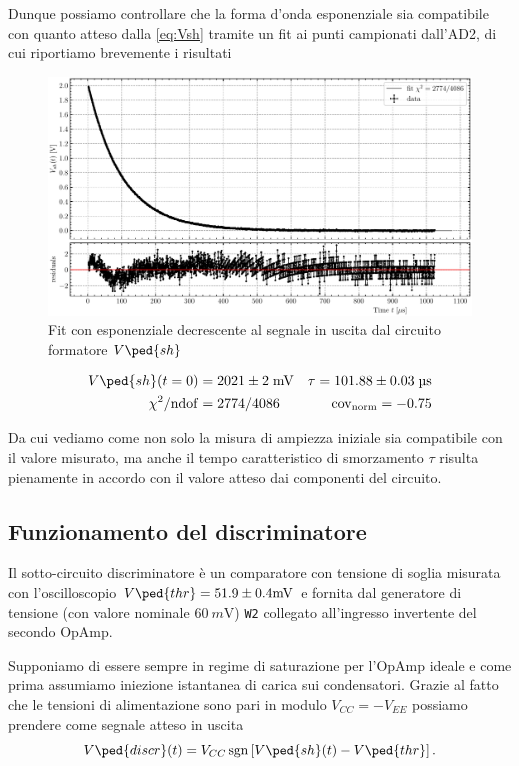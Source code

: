 \documentclass[10pt,a4paper]{article}
\begin{document}
Dunque possiamo controllare che la forma d'onda esponenziale sia compatibile
con quanto atteso dalla \eqref{eq:Vsh} tramite un fit ai punti campionati
dall'AD2, di cui riportiamo brevemente i risultati
\begin{figure}[htbp]
    \centering
	\includegraphics[scale=0.6]{tau}
    \caption{Fit con esponenziale decrescente al segnale in uscita dal
    circuito formatore $V\ped{sh}$ \label{fig: tau}}
\end{figure}
\begin{align*}
V\ped{sh} (t=0) &= 2021 \pm 2 \; \si{m\V}
&\tau = 101.88 \pm 0.03 \; \si{\micro\s} \\
\chi^2/\mathrm{ndof} &= 2774/4086 &\mathrm{cov_{norm}} = -0.75
\end{align*}

Da cui vediamo come non solo la misura di ampiezza iniziale sia compatibile
con il valore misurato, ma anche il tempo caratteristico di smorzamento $\tau$
risulta pienamente in accordo con il valore atteso dai componenti del
circuito.

\setcounter{subsection}{3}
\subsection{Funzionamento del discriminatore}
Il sotto-circuito discriminatore è un comparatore con tensione di soglia
misurata con l'oscilloscopio $V\ped{thr} = 51.9 \pm 0.4 \si{m\V}$ e fornita
dal generatore di tensione (con valore nominale $\SI{60}{m\V}$) \verb+W2+
collegato all'ingresso invertente del secondo OpAmp.

Supponiamo di essere sempre in regime di saturazione per l'OpAmp ideale e
come prima assumiamo iniezione istantanea di carica sui condensatori. 
Grazie al fatto che le tensioni di alimentazione sono pari in modulo
$V_{CC} = - V_{EE}$ possiamo prendere come segnale atteso in uscita
\begin{equation}\label{eq: Vdiscr}
V\ped{discr} (t) = V_{CC} \sgn\left[V\ped{sh}(t) - V\ped{thr}\right].
\end{equation}
\end{document}
